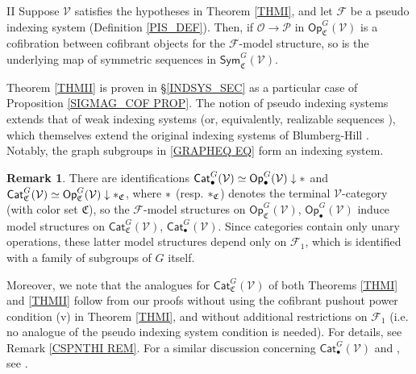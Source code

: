 \documentclass[a4paper,10pt
,draft
]{article}%
\numberwithin{equation}{section}
\numberwithin{figure}{section}
\theoremstyle{definition} %
\newtheorem{remark}[equation]{Remark}%
\newcommand{\Sym}{\ensuremath{\mathsf{Sym}}}%
\newcommand{\Cat}{\mathsf{Cat}}
\newcommand{\Op}{\mathsf{Op}}%
\newcommand{\F}{\ensuremath{\mathcal F}}
\newcommand{\V}{\ensuremath{\mathcal V}}
\renewcommand{\O}{\ensuremath{\mathcal O}}
\newcommand{\1}{\ensuremath{\mathbbm 1}}%
\begin{document}
\begin{customthm}{II}\label{THMII}
	Suppose $\V$ satisfies the hypotheses in Theorem \ref{THMI},
	and let $\F$ be a pseudo indexing system (Definition \ref{PIS_DEF}).
	Then, if $\O \to \mathcal{P}$ in $\Op^G_{\mathfrak{C}}(\V)$ is a cofibration between cofibrant objects for the $\F$-model structure,
	so is the underlying
	map of symmetric sequences in $\Sym^G_{\mathfrak{C}}(\V)$.
\end{customthm}


Theorem \ref{THMII} is proven in \S \ref{INDSYS_SEC}
as a particular case of Proposition \ref{SIGMAG_COF PROP}.
The notion of pseudo indexing systems
extends that of weak indexing systems \cite[Def. 4.49]{BP_geo}
(or, equivalently, realizable sequences \cite[Def. 4.6]{GW18}),
which themselves extend the original 
indexing systems of Blumberg-Hill \cite{BH15}.
Notably, the graph subgroups in \eqref{GRAPHEQ EQ} form an indexing system.



\begin{remark}\label{RESTTOCATS REM}
	There are identifications
	$\Cat_\bullet^G(\V) \simeq \Op_\bullet^G(\V) \downarrow \**$ and
	$\Cat_{\mathfrak C}^G(\V) \simeq \Op_{\mathfrak C}^G(\V) \downarrow \**_{\mathfrak C}$,
	where $\**$ (resp. $\**_{\mathfrak C}$) denotes the terminal $\V$-category (with color set $\mathfrak C$),
	so the $\F$-model structures on $\Op_{\mathfrak C}^G(\V)$, $\Op_\bullet^G(\V)$
	induce model structures on $\Cat_{\mathfrak C}^G(\V)$, $\Cat_\bullet^G(\V)$.
	Since categories contain only unary operations,
	these latter model structures depend only on $\F_1$,
	which is identified with a family of subgroups of $G$ itself.

	Moreover, we note that the analogues 
	for $\Cat_{\mathfrak C}^G(\V)$
	of both Theorems \ref{THMI} and \ref{THMII}
	follow from our proofs without using
	the cofibrant pushout power condition (v)
	in Theorem \ref{THMI},
	and without additional restrictions on $\F_1$
	(i.e. no analogue of the pseudo indexing system condition  is needed).
	For details, see Remark \ref{CSPNTHI REM}.
	For a similar discussion concerning
	$\Cat_\bullet^G(\V)$ and
	\cite[Thm. \ref{AC-THMA}]{BP_ACOP},
	see \cite[Rem. \ref{AC-RESTTOCATS REM}]{BP_ACOP}.
\end{remark}
\end{document}
